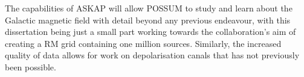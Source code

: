 


The capabilities of ASKAP will allow POSSUM to study and learn about the Galactic magnetic field with detail beyond any previous endeavour, with this dissertation being just a small part working towards the collaboration's aim of creating a RM grid containing one million sources. Similarly, the increased quality of data allows for work on depolarisation canals that has not previously been possible.